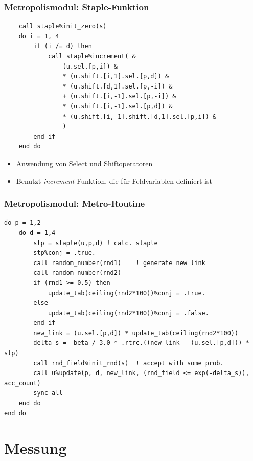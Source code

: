 \documentclass[10pt]{beamer}
\begin{document}
\begin{frame}[fragile]
    \frametitle{Metropolismodul: Staple-Funktion}
    \begin{minipage}{0.63\linewidth}
    \begin{lstlisting}
    call staple%init_zero(s)
    do i = 1, 4
        if (i /= d) then
            call staple%increment( &
                (u.sel.[p,i]) &
                * (u.shift.[i,1].sel.[p,d]) &
                * (u.shift.[d,1].sel.[p,-i]) &
                + (u.shift.[i,-1].sel.[p,-i]) &
                * (u.shift.[i,-1].sel.[p,d]) &
                * (u.shift.[i,-1].shift.[d,1].sel.[p,i]) &
                )
        end if
    end do
    \end{lstlisting}
    \end{minipage}
    \hfill
    \begin{minipage}{0.33\linewidth}
        \begin{itemize}
        	\item Anwendung von Select und Shiftoperatoren
        	\item Benutzt \emph{increment}-Funktion, die für Feldvariablen definiert ist
        \end{itemize}
    \end{minipage}
\end{frame}

\begin{frame}[fragile]
    \frametitle{Metropolismodul: Metro-Routine}
    \begin{lstlisting}
do p = 1,2
    do d = 1,4
        stp = staple(u,p,d)	! calc. staple
        stp%conj = .true.
        call random_number(rnd1)	! generate new link
        call random_number(rnd2)
        if (rnd1 >= 0.5) then
            update_tab(ceiling(rnd2*100))%conj = .true.
        else
            update_tab(ceiling(rnd2*100))%conj = .false.
        end if
        new_link = (u.sel.[p,d]) * update_tab(ceiling(rnd2*100))
        delta_s = -beta / 3.0 * .rtrc.((new_link - (u.sel.[p,d])) * stp)
        call rnd_field%init_rnd(s)	! accept with some prob.
        call u%update(p, d, new_link, (rnd_field <= exp(-delta_s)), acc_count)
        sync all
    end do
end do
	\end{lstlisting}
\end{frame}

\section*{Messung}
\end{document}
